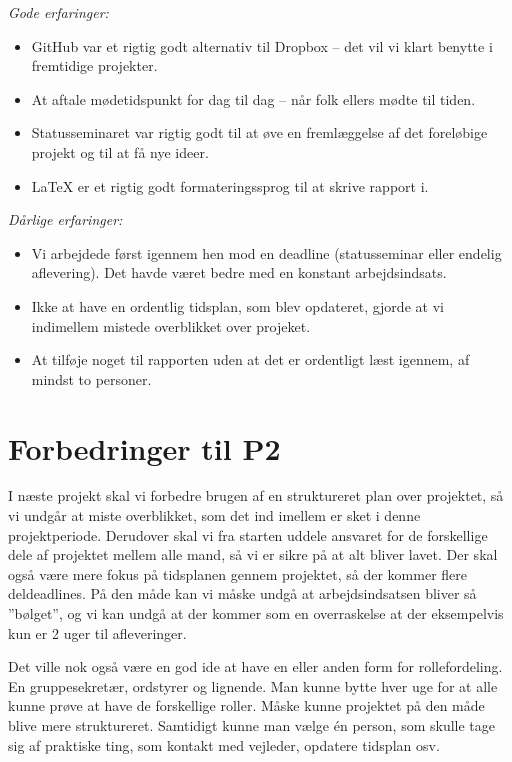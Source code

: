 \emph{Gode erfaringer:}
\begin {itemize}
\item  GitHub var et rigtig godt alternativ til Dropbox – det vil vi klart benytte i fremtidige projekter.

\item	At aftale mødetidspunkt for dag til dag – når folk ellers mødte til tiden. 

\item	Statusseminaret var rigtig godt til at øve en fremlæggelse af det foreløbige projekt og til at få nye ideer.

\item	\LaTeX{} er et rigtig godt formateringssprog til at skrive rapport i.
\end{itemize}\emph{Dårlige erfaringer:}
\begin{itemize}
\item	Vi arbejdede først igennem hen mod en deadline (statusseminar eller endelig aflevering). Det havde været bedre med en konstant arbejdsindsats. 

\item	Ikke at have en ordentlig tidsplan, som blev opdateret, gjorde at vi indimellem mistede overblikket over projeket. 

\item	At tilføje noget til rapporten uden at det er ordentligt læst igennem, af mindst to personer.
\end{itemize}

\section{Forbedringer til P2}

I næste projekt skal vi forbedre brugen af en struktureret plan over projektet, så vi undgår at miste overblikket, som det ind imellem er sket i denne projektperiode. Derudover skal vi fra starten uddele ansvaret for de forskellige dele af projektet mellem alle mand, så vi er sikre på at alt bliver lavet. Der skal også være mere fokus på tidsplanen gennem projektet, så der kommer flere deldeadlines. På den måde kan vi måske undgå at arbejdsindsatsen bliver så ”bølget”, og vi kan undgå at der kommer som en overraskelse at der eksempelvis kun er 2 uger til afleveringer.

Det ville nok også være en god ide at have en eller anden form for rollefordeling. En gruppesekretær, ordstyrer og lignende. Man kunne bytte hver uge for at alle kunne prøve at have de forskellige roller. Måske kunne projektet på den måde blive mere struktureret. Samtidigt kunne man vælge én person, som skulle tage sig af praktiske ting, som kontakt med vejleder, opdatere tidsplan osv.
